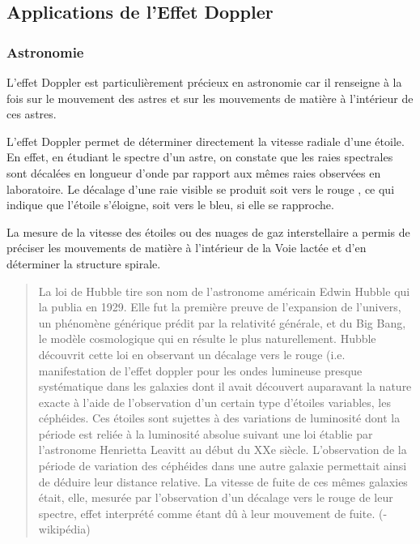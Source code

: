 \documentclass[11pt,a4paper]{article}
\begin{document}
\subsection{Applications de l'Effet Doppler}

\subsubsection*{Astronomie}
L’effet Doppler est particulièrement précieux en astronomie car il renseigne à la fois sur le mouvement des astres et sur les mouvements de matière à l’intérieur de ces astres.

L’effet Doppler permet de déterminer directement la vitesse radiale d’une étoile. En effet, en étudiant le spectre d’un astre, on constate que les raies spectrales sont décalées en longueur d’onde par rapport aux mêmes raies observées en laboratoire. Le décalage d’une raie visible se produit soit vers le rouge , ce qui indique que l’étoile s’éloigne, soit vers le bleu, si elle se rapproche.

La mesure de la vitesse des étoiles ou des nuages de gaz interstellaire a permis de préciser les mouvements de matière à l’intérieur de la Voie lactée et d’en déterminer la structure spirale.
\begin{quote}
  La loi de Hubble tire son nom de l'astronome américain Edwin Hubble qui la publia en 1929. Elle fut la première preuve de l'expansion de l'univers, un phénomène générique prédit par la relativité générale, et du Big Bang, le modèle cosmologique qui en résulte le plus naturellement. Hubble découvrit cette loi en observant un décalage vers le rouge  (i.e. manifestation de l’effet doppler pour les ondes lumineuse presque systématique dans les galaxies dont il avait découvert auparavant la nature exacte à l'aide de l'observation d'un certain type d'étoiles variables, les céphéides. Ces étoiles sont sujettes à des variations de luminosité dont la période est reliée à la luminosité absolue suivant une loi établie par l'astronome Henrietta Leavitt au début du XXe siècle. L'observation de la période de variation des céphéides dans une autre galaxie permettait ainsi de déduire leur distance relative. La vitesse de fuite de ces mêmes galaxies était, elle, mesurée par l'observation d'un décalage vers le rouge de leur spectre, effet interprété comme étant dû à leur mouvement de fuite.   (-wikipédia)  
\end{quote}
\end{document}
